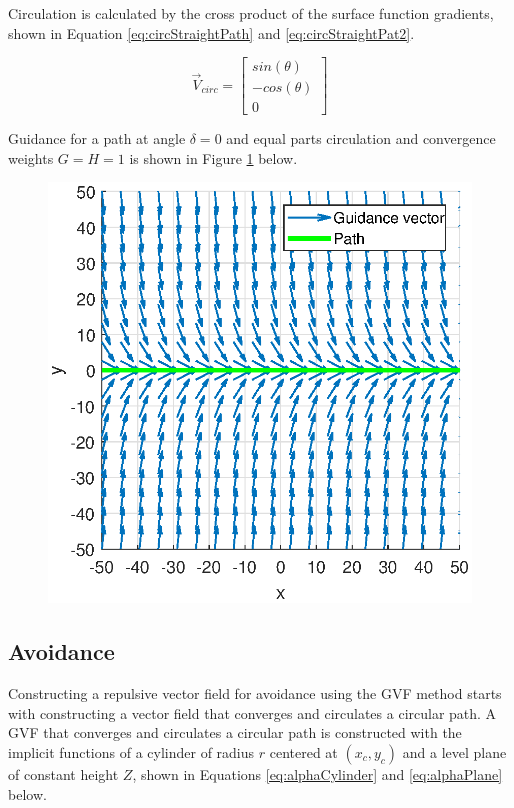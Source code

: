 \documentclass[conf]{new-aiaa}
\begin{document}
Circulation is calculated by the cross product of the surface function gradients, shown in Equation \ref{eq:circStraightPath} and \ref{eq:circStraightPat2}.



\begin{equation}
\label{eq:circStraightPat2}
\overrightarrow{V}_{circ} = \begin{bmatrix}
sin(\theta) \\
-cos(\theta) \\
0
\end{bmatrix}
\end{equation}

Guidance for a path at angle $\delta = 0$ and equal parts circulation and convergence weights $G=H=1$ is shown in Figure \ref{fig:straightpath} below.

\begin{figure}[H]
	\centering
	\includegraphics[width=0.7\linewidth]{Figures/methods/straightPath}
	\caption{}
	\label{fig:straightpath}
\end{figure}



\subsection{Avoidance}

Constructing a repulsive vector field for avoidance using the GVF method starts with constructing a vector field that converges and circulates a circular path. A GVF that converges and circulates a circular path is constructed with the implicit functions of a cylinder of radius $r$ centered at $(x_c,y_c)$ and a level plane of constant height $Z$, shown in Equations \ref{eq:alphaCylinder} and \ref{eq:alphaPlane} below.
\end{document}
